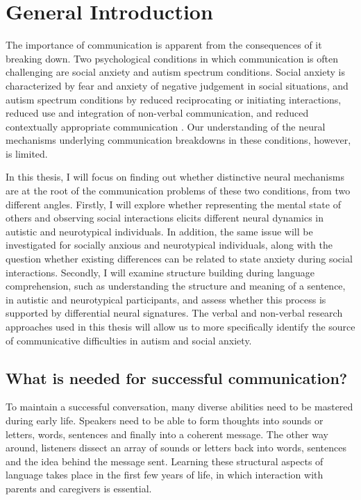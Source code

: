 \chapter{General Introduction}
\label{ch:introduction}
\thispagestyle{empty}

The importance of communication is apparent from the consequences of it breaking down. Two psychological conditions in which communication is often challenging are social anxiety and autism spectrum conditions. Social anxiety is characterized by fear and anxiety of negative judgement in social situations, and autism spectrum conditions by reduced reciprocating or initiating interactions, reduced use and integration of non-verbal communication, and reduced contextually appropriate communication \citep{apa2013}. Our understanding of the neural mechanisms underlying communication breakdowns in these conditions, however, is limited.

In this thesis, I will focus on finding out whether distinctive neural mechanisms are at the root of the communication problems of these two conditions, from two different angles. Firstly, I will explore whether representing the mental state of others and observing social interactions elicits different neural dynamics in autistic and neurotypical individuals. In addition, the same issue will be investigated for socially anxious and neurotypical individuals, along with the question whether existing differences can be related to state anxiety during social interactions. Secondly, I will examine structure building during language comprehension, such as understanding the structure and meaning of a sentence, in autistic and neurotypical participants, and assess whether this process is supported by differential neural signatures. The verbal and non-verbal research approaches used in this thesis will allow us to more specifically identify the source of communicative difficulties in autism and social anxiety. 

\section*{What is needed for successful communication?}

To maintain a successful conversation, many diverse abilities need to be mastered during early life. Speakers need to be able to form thoughts into sounds or letters, words, sentences and finally into a coherent message. The other way around, listeners dissect an array of sounds or letters back into words, sentences and the idea behind the message sent. Learning these structural aspects of language takes place in the first few years of life, in which interaction with parents and caregivers is essential. 

